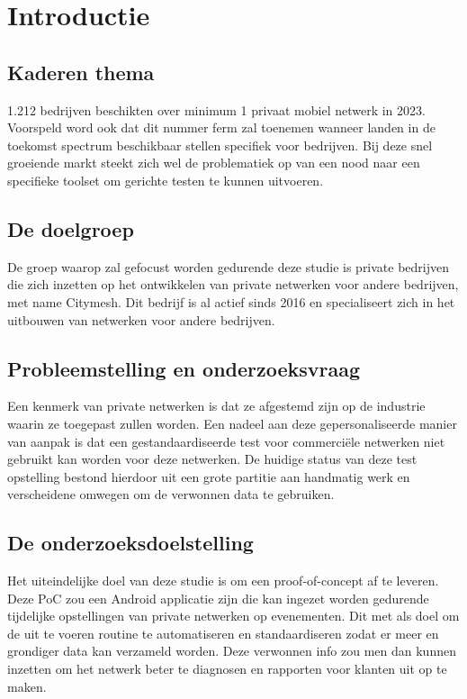 
\section{Introductie}%
\label{sec:introductie}

\subsection{Kaderen thema}

1.212 bedrijven beschikten over minimum 1 privaat mobiel netwerk in 2023. Voorspeld word ook dat dit nummer ferm zal toenemen wanneer landen in de toekomst spectrum beschikbaar stellen specifiek voor bedrijven. \autocite{Dux2023} Bij deze snel groeiende markt steekt zich wel de problematiek op van een nood naar een specifieke toolset om gerichte testen te kunnen uitvoeren.

\subsection{De doelgroep}

De groep waarop zal gefocust worden gedurende deze studie is private bedrijven die zich inzetten op het ontwikkelen van private netwerken voor andere bedrijven, met name Citymesh. Dit bedrijf is al actief sinds 2016 en specialiseert zich in het uitbouwen van netwerken voor andere bedrijven. \autocite{Cassauwers2019}

\subsection{Probleemstelling en onderzoeksvraag}

Een kenmerk van private netwerken is dat ze afgestemd zijn op de industrie waarin ze toegepast zullen worden. \autocite{Alen2020} Een nadeel aan deze gepersonaliseerde manier van aanpak is dat een gestandaardiseerde test voor commerciële netwerken niet gebruikt kan worden voor deze netwerken. De huidige status van deze test opstelling bestond hierdoor uit een grote partitie aan handmatig werk en verscheidene omwegen om de verwonnen data te gebruiken.

\subsection{De onderzoeksdoelstelling}

Het uiteindelijke doel van deze studie is om een proof-of-concept af te leveren. Deze PoC zou een Android applicatie zijn die kan ingezet worden gedurende tijdelijke opstellingen van private netwerken op evenementen. Dit met als doel om de uit te voeren routine te automatiseren en standaardiseren zodat er meer en grondiger data kan verzameld worden. Deze verwonnen info zou men dan kunnen inzetten om het netwerk beter te diagnosen en rapporten voor klanten uit op te maken.

